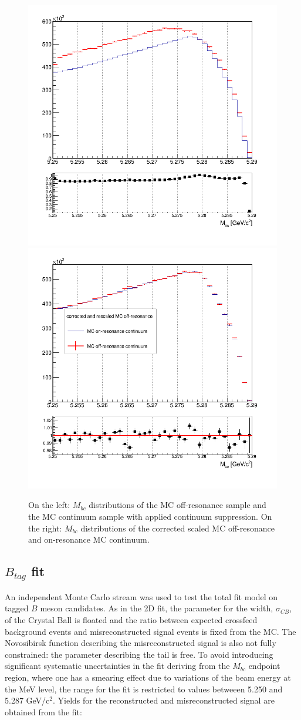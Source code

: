 \begin{figure}[H]
 \centering
\subcaptionbox{\label{fig:stream0_chargedBtag_off-on_resonance}}
{\includegraphics[width=.45\textwidth]{04-chargedCorrBtoLambda/figs/stream0_chargedBtag_off-on_resonance.png}}
\subcaptionbox{\label{fig:bin_corrected_stream1_off-resonance_on_stream0_on-resonance}}
{\includegraphics[width=.44\textwidth]{04-chargedCorrBtoLambda/figs/bin_corrected_stream1_off-resonance_on_stream0_on-resonance.png}} 
\caption{On the left: $M_{bc}$ distributions of the MC off-resonance sample and the MC continuum sample with applied continuum suppression. On the right: $M_{bc}$ distributions of the corrected scaled MC off-resonance and on-resonance MC continuum.}
\end{figure}



\newpage
\subsection{ $B_{tag}$ fit}\label{BtagFit}
An independent Monte Carlo stream was used to test the total fit model on tagged $B$ meson candidates.
As in the 2D fit, the parameter for the width, $\sigma_{CB}$, of the Crystal Ball is floated and the ratio between expected crossfeed background events and  misreconstructed signal events is fixed from the MC. 
The Novosibirsk function describing the misreconstructed signal is also not fully constrained: the parameter describing the tail is free. To avoid introducing significant systematic
uncertainties in the fit deriving from the $M_{bc}$ endpoint region, where one has a smearing effect due to variations of the
beam energy at the MeV level, the range for the fit is restricted to values betweeen 5.250 and 5.287 GeV/c$^2$.
Yields for the reconstructed and misreconstructed signal are obtained from the fit:\\
\vspace{0.25 cm}

